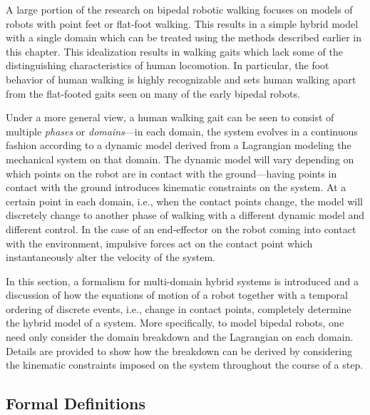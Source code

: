 %
A large portion of the research on bipedal robotic walking focuses on models of
robots with point feet or flat-foot walking.
%
This results in a simple hybrid model with a single domain which can be treated
using the methods described earlier in this chapter.
%
This idealization results in walking gaits which lack some of the distinguishing
characteristics of human locomotion.
%
In particular, the foot behavior of human walking is highly recognizable and
sets human walking apart from the flat-footed gaits seen on many of the early
bipedal robots.

Under a more general view, a human walking gait can be seen to consist of
multiple {\em phases} or {\em domains}---in each domain, the system evolves in a
continuous fashion according to a dynamic model derived from a Lagrangian
modeling the mechanical system on that domain.
%
The dynamic model will vary depending on which points on the robot are in
contact with the ground---having points in contact with the ground introduces
kinematic constraints on the system.
%
At a certain point in each domain, i.e., when the contact points change, the
model will discretely change to another phase of walking with a different
dynamic model and different control.
%
In the case of an end-effector on the robot coming into contact with the
environment, impulsive forces act on the contact point which instantaneously
alter the velocity of the system.
%

In this section, a formalism for multi-domain hybrid systems is introduced and a
discussion of how the equations of motion of a robot together with a temporal
ordering of discrete events, i.e., change in contact points, completely
determine the hybrid model of a system.
%
More specifically, to model bipedal robots, one need only consider the domain
breakdown and the Lagrangian on each domain.
%
Details are provided to show how the breakdown can be derived by considering the
kinematic constraints imposed on the system throughout the course of a step.


\subsection{Formal Definitions}

